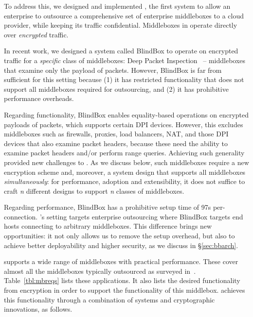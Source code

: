 To address this, we designed and implemented \sys, the first system to allow an enterprise to outsource  a comprehensive set of enterprise middleboxes  to a cloud provider, while keeping its traffic confidential. 
Middleboxes in \sys operate directly over {\it encrypted} traffic. %


In recent work, we designed a system called BlindBox to operate on encrypted traffic for a {\em specific} class of middleboxes: Deep Packet Inspection~\cite{blindbox} -- middleboxes that examine only the payload of packets. 
However, BlindBox is far from sufficient for this setting because
 (1) it has restricted functionality that does not support all middleboxes required for outsourcing, and (2) it has prohibitive performance overheads.
 
 Regarding functionality, BlindBox enables equality-based operations on  encrypted payloads of packets, which supports certain DPI devices. However, this excludes middleboxes such as firewalls, proxies, load balancers, NAT,  and those DPI devices that also examine packet headers, because these need the ability to examine packet headers and/or perform range queries. 
 Achieving such generality provided new challenges to \sys. 
As we discuss below, such middleboxes require a new encryption scheme and, moreover, a system design that supports all middleboxes {\it simultaneously}: for performance, adoption and extensibility, it does not suffice to craft {\it n} different designs to support {\it n} classes of middleboxes. 

 
Regarding performance, BlindBox has a prohibitive setup time of 97s per-connection. 
\sys's setting targets enterprise outsourcing where BlindBox targets end hosts connecting to arbitrary middleboxes. This difference brings \sys new opportunities: it
not only allows us to remove the setup overhead, but also to achieve better deployability and higher security, as we discuss in \S\ref{sec:bbarch}. 

\sys supports a wide range of middleboxes with practical performance. These cover almost all the middleboxes typically outsourced as surveyed in~\cite{aplomb}. 
Table~\ref{tbl:mbreqs} lists these applications. It also lists the desired functionality from encryption in order to support the functionality of this middlebox.  \sys achieves this functionality through a combination of systems and cryptographic innovations, as follows.
   
